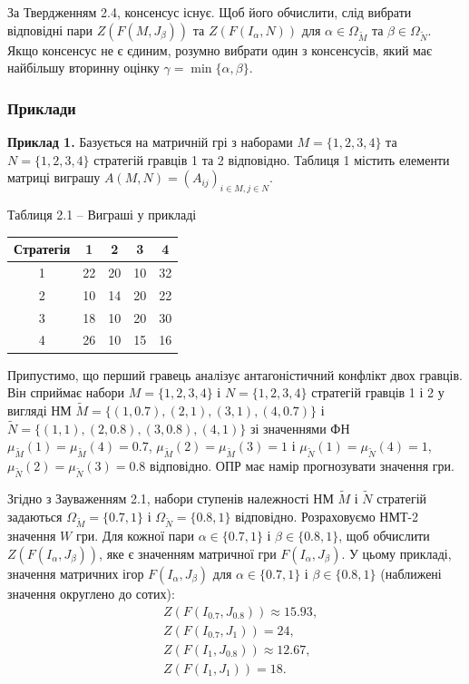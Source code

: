 \documentclass[14pt, a4paper, oneside]{extarticle}
\numberwithin{equation}{section}
\begin{document}
За Твердженням 2.4, консенсус існує. Щоб його обчислити, слід вибрати відповідні пари $Z\left(F\left(M, J_{\beta}\right)\right)$ та $Z\left(F\left(I_{\alpha}, N\right)\right)$ для $\alpha \in \Omega_{\tilde{M}}$ та $\beta \in \Omega_{\tilde{N}}$. Якщо консенсус не є єдиним, розумно вибрати один з консенсусів, який має найбільшу вторинну оцінку $\gamma = \min \{ \alpha, \beta\}$.

\subsubsection{Приклади}
\textbf{Приклад 1.} Базується на матричній грі з наборами $M = \{1, 2, 3, 4\}$ та $N = \{1, 2, 3, 4\}$ стратегій гравців 1 та 2 відповідно. Таблиця 1 містить елементи матриці виграшу $A(M, N) = \left(A_{ij}\right)_{i \in M, j \in N}$.

\vspace{1.5ex}
Таблиця 2.1 -- Виграші у прикладі
\begin{center}
\begin{tabular}{|c|c|c|c|c|}
\hline
Стратегія & 1 & 2 & 3 & 4 \\
\hline
1 & 22 & 20 & 10 & 32 \\
\hline
2 & 10 & 14 & 20 & 22 \\
\hline
3 & 18 & 10 & 20 & 30 \\
\hline
4 & 26 & 10 & 15 & 16 \\
\hline
\end{tabular}
\end{center}
\vspace{1.5ex}

Припустимо, що перший гравець аналізує антагоністичний конфлікт двох гравців. Він сприймає набори $M = \{1, 2, 3, 4\}$ і $N = \{1, 2, 3, 4\}$ стратегій гравців 1 і 2 у вигляді НМ $\tilde{M} = \{(1, 0.7), (2, 1), (3, 1), (4, 0.7)\}$ і $\tilde{N} = \{(1, 1), (2, 0.8), (3, 0.8), (4, 1)\}$ зі значеннями ФН $\mu_{\tilde{M}}(1) = \mu_{\tilde{M}}(4) = 0.7$, $\mu_{\tilde{M}}(2) = \mu_{\tilde{M}}(3) = 1$ і $\mu_{\tilde{N}}(1) = \mu_{\tilde{N}}(4) = 1$, $\mu_{\tilde{N}}(2) = \mu_{\tilde{N}}(3) = 0.8$ відповідно. ОПР має намір прогнозувати значення гри.

Згідно з Зауваженням 2.1, набори ступенів належності НМ $\tilde{M}$ і $\tilde{N}$ стратегій задаються $\Omega_{\tilde{M}} = \{0.7, 1\}$ і $\Omega_{\tilde{N}} = \{0.8, 1\}$ відповідно. Розраховуємо НМТ-2 значення $W$ гри. Для кожної пари $\alpha \in \{0.7, 1\}$ і $\beta \in \{0.8, 1\}$, щоб обчислити $Z\left(F\left(I_{\alpha}, J_{\beta}\right)\right)$, яке є значенням матричної гри $F\left(I_{\alpha}, J_{\beta}\right)$. У цьому прикладі, значення матричних ігор $F\left(I_{\alpha}, J_{\beta}\right)$ для $\alpha \in \{0.7, 1\}$ і $\beta \in \{0.8, 1\}$ (наближені значення округлено до сотих):
\begin{align*}
&Z\left(F\left(I_{0.7}, J_{0.8}\right)\right) \approx 15.93,\\
&Z\left(F\left(I_{0.7}, J_{1}\right)\right) = 24,\\
&Z\left(F\left(I_{1}, J_{0.8}\right)\right) \approx 12.67,\\
&Z\left(F\left(I_{1}, J_{1}\right)\right) = 18.
\end{align*}
\end{document}

